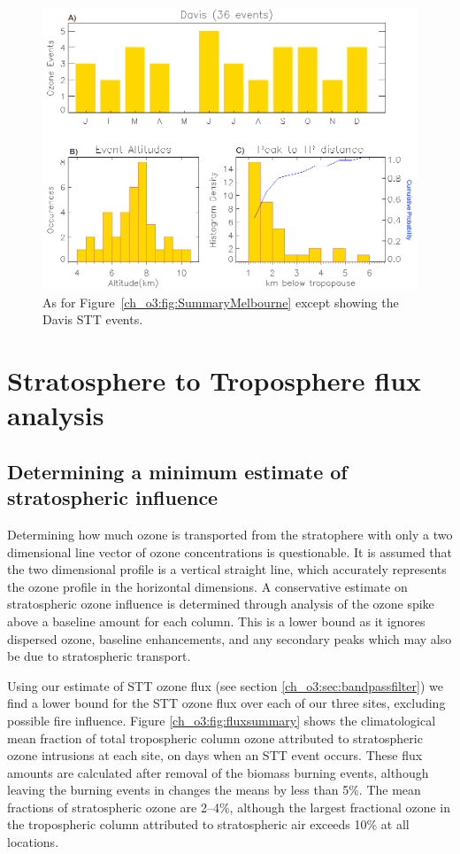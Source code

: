     \begin{figure}[!htbp]
      \includegraphics[width=0.8\columnwidth]{Figures/Ozone/Summary_Davi}
      \caption{
      As for Figure~\ref{ch_o3:fig:SummaryMelbourne} except showing the Davis STT events.%
      }
      \label{ch_o3:fig:SummaryDavis}
    \end{figure}
    
\section{Stratosphere to Troposphere flux analysis}
  \subsection{Determining a minimum estimate of stratospheric influence}
    Determining how much ozone is transported from the stratophere with only a two dimensional line vector of ozone concentrations is questionable.
    It is assumed that the two dimensional profile is a vertical straight line, which accurately represents the ozone profile in the horizontal dimensions.
    A conservative estimate on stratospheric ozone influence is determined through analysis of the ozone spike above a baseline amount for each column.
    This is a lower bound as it ignores dispersed ozone, baseline enhancements, and any secondary peaks which may also be due to stratospheric transport.
    
    Using our estimate of STT ozone flux (see section \ref{ch_o3:sec:bandpassfilter}) we find a lower bound for the STT ozone flux over each of our three sites, excluding possible fire influence.
    Figure \ref{ch_o3:fig:fluxsummary} shows the climatological mean fraction of total tropospheric column ozone attributed to stratospheric ozone intrusions at each site, on days when an STT event occurs. These flux amounts are calculated after removal of the biomass burning events, although leaving the burning events in changes the means by less than 5\%. The mean fractions of stratospheric ozone are 2--4\%, although the largest fractional ozone in the tropospheric column attributed to stratospheric air exceeds 10\% at all locations.
      

